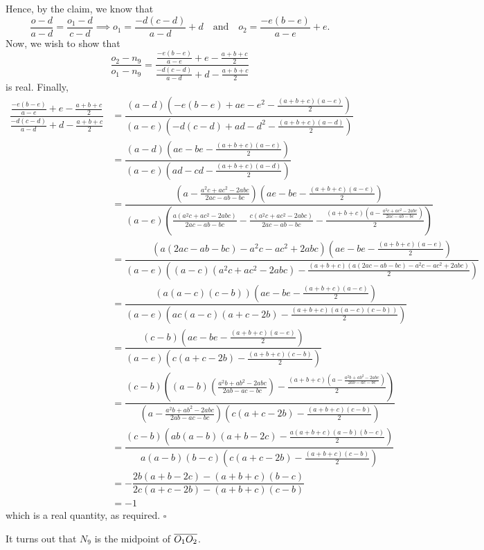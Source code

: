 \documentclass{article}
\begin{document}
Hence, by the claim, we know that \[\dfrac{o-d}{a-d} = \dfrac{o_1-d}{c-d} \implies o_1 = \dfrac{-d(c-d)}{a-d}+d \quad \text{and} \quad o_2 = \dfrac{-e(b-e)}{a-e}+e.\] Now, we wish to show that \[\dfrac{o_2-n_9}{o_1-n_9} = \dfrac{\tfrac{-e(b-e)}{a-e}+e-\tfrac{a+b+c}{2}}{\tfrac{-d(c-d)}{a-d}+d-\tfrac{a+b+c}{2}}\] is real. Finally,
\begin{align*}
\dfrac{\tfrac{-e(b-e)}{a-e}+e-\tfrac{a+b+c}{2}}{\tfrac{-d(c-d)}{a-d}+d-\tfrac{a+b+c}{2}} &= \dfrac{(a-d)\left(-e(b-e)+ae-e^2-\tfrac{(a+b+c)(a-e)}{2}\right)}{(a-e)\left(-d(c-d)+ad-d^2-\tfrac{(a+b+c)(a-d)}{2}\right)} \\
&= \dfrac{(a-d)\left(ae-be-\tfrac{(a+b+c)(a-e)}{2}\right)}{(a-e)\left(ad-cd-\tfrac{(a+b+c)(a-d)}{2}\right)} \\
&= \dfrac{(a-\tfrac{a^2c+ac^2-2abc}{2ac-ab-bc})\left(ae-be-\tfrac{(a+b+c)(a-e)}{2}\right)}{(a-e)\left(\tfrac{a(a^2c+ac^2-2abc)}{2ac-ab-bc}-\tfrac{c(a^2c+ac^2-2abc)}{2ac-ab-bc}-\tfrac{(a+b+c)\left(a-\tfrac{a^2c+ac^2-2abc}{2ac-ab-bc}\right)}{2}\right)} \\
&= \dfrac{(a(2ac-ab-bc)-a^2c-ac^2+2abc)\left(ae-be-\tfrac{(a+b+c)(a-e)}{2}\right)}{(a-e)\left((a-c)(a^2c+ac^2-2abc)-\tfrac{(a+b+c)\left(a(2ac-ab-bc)-a^2c-ac^2+2abc\right)}{2}\right)} \\
&= \dfrac{(a(a-c)(c-b))\left(ae-be-\tfrac{(a+b+c)(a-e)}{2}\right)}{(a-e)\left(ac(a-c)(a+c-2b)-\tfrac{(a+b+c)\left(a(a-c)(c-b)\right)}{2}\right)} \\
&= \dfrac{(c-b)\left(ae-be-\tfrac{(a+b+c)(a-e)}{2}\right)}{(a-e)\left(c(a+c-2b)-\tfrac{(a+b+c)(c-b)}{2}\right)} \\
&= \dfrac{(c-b)\left((a-b)\left(\tfrac{a^2b+ab^2-2abc}{2ab-ac-bc}\right)-\tfrac{(a+b+c)\left(a-\tfrac{a^2b+ab^2-2abc}{2ab-ac-bc}\right)}{2}\right)}{\left(a-\tfrac{a^2b+ab^2-2abc}{2ab-ac-bc}\right)\left(c(a+c-2b)-\tfrac{(a+b+c)(c-b)}{2}\right)} \\
&= \dfrac{(c-b)\left(ab(a-b)\left(a+b-2c\right)-\tfrac{a(a+b+c)(a-b)(b-c)}{2}\right)}{a(a-b)(b-c)\left(c(a+c-2b)-\tfrac{(a+b+c)(c-b)}{2}\right)} \\
&= -\dfrac{2b\left(a+b-2c\right)-(a+b+c)(b-c)}{2c(a+c-2b)-(a+b+c)(c-b)} \\
&= -1
\end{align*}
which is a real quantity, as required. $\square$
\begin{remark*}
It turns out that $N_9$ is the midpoint of $\overline{O_1O_2}$.
\end{remark*}

\newpage
\end{document}
